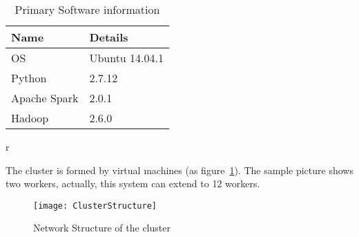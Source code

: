 \begin{table}[h]
	\centering
	\begin{tabular}{|l|l|}
		\hline
		\textbf{Name} & \textbf{Details} \\ \hline
		OS & Ubuntu 14.04.1 \\ \hline
		Python & 2.7.12 \\ \hline
		Apache Spark & 2.0.1 \\ \hline
		Hadoop & 2.6.0 \\ \hline
	\end{tabular}r
	\caption{Primary Software information}
	\label{tb:softwareList}
\end{table}
The cluster is formed by virtual machines (as figure~\ref{fg:clustur}). The sample picture shows two workers, actually, this system can extend to 12 workers.
\begin{figure}[t]
	\centering
	\texttt{[image: ClusterStructure]}
	\caption{Network Structure of the cluster}
	\label{fg:clustur}
\end{figure}